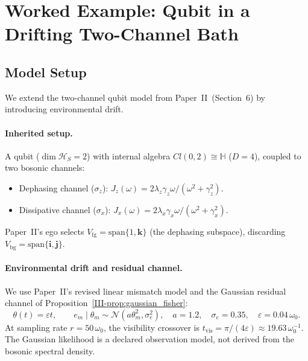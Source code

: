 \documentclass[12pt,a4paper,openany]{book}
\begin{document}
\section{Worked Example: Qubit in a Drifting
Two-Channel Bath}
\label{III-sec:example}

\subsection{Model Setup}
\label{III-subsec:model_III}

We extend the two-channel qubit model from
Paper~II~(Section~6) by introducing environmental drift.

\paragraph{Inherited setup.}
A qubit ($\dim\mathcal{H}_S = 2$) with internal algebra
$Cl(0,2) \cong \mathbb{H}$ ($D = 4$), coupled to two
bosonic channels:
\begin{itemize}
\item Dephasing channel ($\sigma_z$):
  $J_z(\omega) = 2\lambda_z\gamma_z\omega/
  (\omega^2 + \gamma_z^2)$.
\item Dissipative channel ($\sigma_x$):
  $J_x(\omega) = 2\lambda_x\gamma_x\omega/
  (\omega^2 + \gamma_x^2)$.
\end{itemize}
Paper~II's ego selects $V_{\mathrm{fg}}
= \mathrm{span}\{1,\mathbf{k}\}$ (the dephasing subspace),
discarding $V_{\mathrm{bg}}
= \mathrm{span}\{\mathbf{i},\mathbf{j}\}$.

\paragraph{Environmental drift and residual channel.}
We use Paper~II's revised linear mismatch model and the Gaussian
residual channel of Proposition~\ref{III-prop:gaussian_fisher}:
\begin{equation}
\label{III-eq:drift_model}
\theta(t)=\varepsilon t,\qquad
e_m\mid\theta_m\sim\mathcal N(a\theta_m^2,\sigma_e^2),
\quad a=1.2,\quad\sigma_e=0.35,\quad
\varepsilon=0.04\,\omega_0.
\end{equation}
At sampling rate $r=50\,\omega_0$, the visibility crossover is
$t_{\mathrm{vis}}=\pi/(4\varepsilon)\approx19.63\,\omega_0^{-1}$.
The Gaussian likelihood is a declared observation model, not derived
from the bosonic spectral density.
\end{document}
